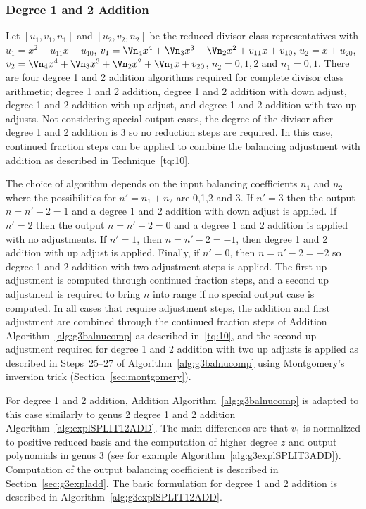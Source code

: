 \subsubsection{Degree 1 and 2 Addition}
Let $[u_1,v_1,n_1]$ and $[u_2,v_2,n_2]$ be the reduced divisor class representatives
with $u_1 = x^2 + u_{11}x + u_{10}$, $v_1 = \Vn_4x^4 + \Vn_3x^3 + \Vn_2x^2 +
v_{11}x + v_{10}$, $u_2 = x + u_{20}$, $v_2 = \Vn_4x^4 + \Vn_3x^3 + \Vn_2x^2 +
\Vn_1x + v_{20}$, $n_2 = 0,1,2$ and $n_1 = 0,1$. There are four degree 1 and 2
addition algorithms required for complete divisor class arithmetic; degree 1 and
2 addition, degree 1 and 2 addition with down adjust, degree 1 and 2 addition
with up adjust, and degree 1 and 2 addition with two up adjusts. Not considering
special output cases, the degree of the divisor after degree 1 and 2 addition is
3 so no reduction steps are required. In this case, continued fraction steps can
be applied to combine the balancing adjustment with addition as described in
Technique~\ref{tq:10}.

The choice of algorithm depends on the input balancing coefficients $n_1$ and
$n_2$ where the possibilities for $n' =n_1 + n_2$ are 0,1,2 and 3. If $n' = 3$
then the output $n = n'-2 = 1$ and a degree 1 and 2 addition with down adjust is
applied. If $n' = 2$ then the output $n = n'-2 = 0$ and a degree 1 and 2
addition is applied with no adjustments. If $n'=1$, then $n = n' - 2= -1$, then
degree 1 and 2 addition with up adjust is applied. Finally, if $n' = 0$, then $n
= n' - 2 = -2$ so degree 1 and 2 addition with two adjustment steps is applied. The
first up adjustment is computed through continued fraction steps, and a second
up adjustment is required to bring $n$ into range if no special output case is
computed. In all cases that require adjustment steps, the addition and first
adjustment are combined through the continued fraction steps of Addition
Algorithm~\ref{alg:g3balnucomp} as described in~\ref{tq:10}, and the second up
adjustment required for degree 1 and 2 addition with two up adjusts is applied
as described in Steps~25--27 of Algorithm~\ref{alg:g3balnucomp} using
Montgomery's inversion trick (Section~\ref{sec:montgomery}). 


For degree 1 and 2 addition, Addition Algorithm~\ref{alg:g3balnucomp} is adapted
to this case similarly to genus 2 degree 1 and 2 addition
Algorithm~\ref{alg:explSPLIT12ADD}.  The main differences are that $v_1$ is
normalized to positive reduced basis and the computation of higher degree $z$
and output polynomials in genus 3 (see for example
Algorithm~\ref{alg:g3explSPLIT3ADD}).  Computation of the output balancing
coefficient is described in Section~\ref{sec:g3expladd}. The basic formulation
for degree 1 and 2 addition is described in
Algorithm~\ref{alg:g3explSPLIT12ADD}.

